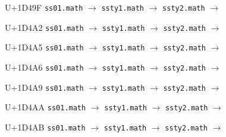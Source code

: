 \documentclass{article}
\begin{document}
\begin{substitutions}
\goodbreak

U+1D49F  \linebreak
    \texttt{ss01.math} $\to$  \linebreak
    \texttt{ssty1.math} $\to$  \linebreak
    \texttt{ssty2.math} $\to$  

\goodbreak

U+1D4A2  \linebreak
    \texttt{ss01.math} $\to$  \linebreak
    \texttt{ssty1.math} $\to$  \linebreak
    \texttt{ssty2.math} $\to$  

\goodbreak

U+1D4A5  \linebreak
    \texttt{ss01.math} $\to$  \linebreak
    \texttt{ssty1.math} $\to$  \linebreak
    \texttt{ssty2.math} $\to$  

\goodbreak

U+1D4A6  \linebreak
    \texttt{ss01.math} $\to$  \linebreak
    \texttt{ssty1.math} $\to$  \linebreak
    \texttt{ssty2.math} $\to$  

\goodbreak

U+1D4A9  \linebreak
    \texttt{ss01.math} $\to$  \linebreak
    \texttt{ssty1.math} $\to$  \linebreak
    \texttt{ssty2.math} $\to$  

\goodbreak

U+1D4AA  \linebreak
    \texttt{ss01.math} $\to$  \linebreak
    \texttt{ssty1.math} $\to$  \linebreak
    \texttt{ssty2.math} $\to$  

\goodbreak

U+1D4AB  \linebreak
    \texttt{ss01.math} $\to$  \linebreak
    \texttt{ssty1.math} $\to$  \linebreak
    \texttt{ssty2.math} $\to$  


\end{substitutions}
\end{document}
